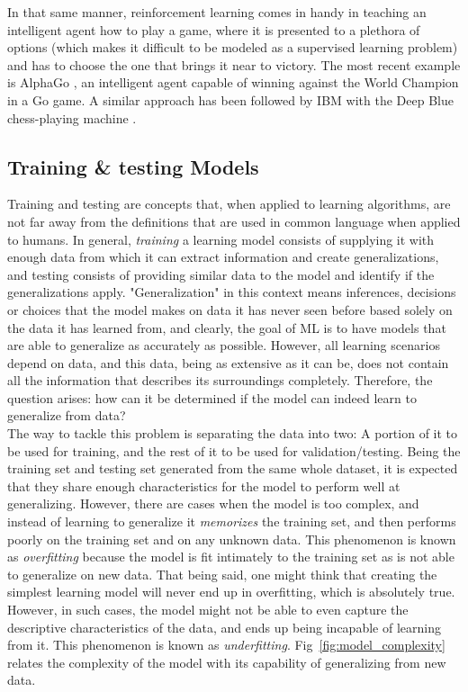 In that same manner, reinforcement learning comes in handy in teaching an intelligent agent how to play a game, where it is presented to a plethora of options (which makes it difficult to be modeled as a supervised learning problem) and has to choose the one that brings it near to victory. The most recent example is AlphaGo \cite{Fu2017}, an intelligent agent capable of winning against the World Champion in a Go game. A similar approach has been followed by IBM with the Deep Blue chess-playing machine \cite{Hsu1999}.

\subsection{Training \& testing Models}
Training and testing are concepts that, when applied to learning algorithms, are not far away from the definitions that are used in common language when applied to humans. In general, \emph{training} a learning model consists of supplying it with enough data from which it can extract information and create generalizations, and testing consists of providing similar data to the model and identify if the generalizations apply. "Generalization" in this context means inferences, decisions or choices that the model makes on data it has never seen before based solely on the data it has learned from, and clearly, the goal of \ac{ML} is to have models that are able to generalize as accurately as possible. However, all learning scenarios depend on data, and this data, being as extensive as it can be, does not contain all the information that describes its surroundings completely. Therefore, the question arises: how can it be determined if the model can indeed learn to generalize from data?\\

The way to tackle this problem is separating the data into two: A portion of it to be used for training, and the rest of it to be used for validation/testing. Being the training set and testing set generated from the same whole dataset, it is expected that they share enough characteristics for the model to perform well at generalizing. However, there are cases when the model is too complex, and instead of learning to generalize it \emph{memorizes} the training set, and then performs poorly on the training set and on any unknown data. This phenomenon is known as \emph{overfitting} because the model is fit intimately to the training set as is not able to generalize on new data. That being said, one might think that creating the simplest learning model will never end up in overfitting, which is absolutely true. However, in such cases, the model might not be able to even capture the descriptive characteristics of the data, and ends up being incapable of learning from it. This phenomenon is known as \emph{underfitting}. Fig~\ref{fig:model_complexity} relates the complexity of the model with its capability of generalizing from new data.

